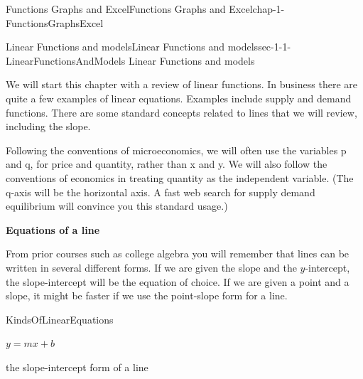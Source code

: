 \documentclass[oneside,10pt,]{book}
\newcommand{\terminology}[1]{\textbf{#1}}
\numberwithin{equation}{section}
\begin{document}
\typeout{************************************************}
%
\begin{chapterptx}{Functions Graphs and Excel}{}{Functions Graphs and Excel}{}{}{chap-1-FunctionsGraphsExcel}
%
%
\typeout{************************************************}
\typeout{************************************************}
%
\begin{sectionptx}{Linear Functions and models}{}{Linear Functions and models}{}{}{sec-1-1-LinearFunctionsAndModels}
\hypertarget{p-28}{}%
Linear Functions and models%
\par
\hypertarget{p-29}{}%
We will start this chapter with a review of linear functions. In business there are quite a few examples of linear equations. Examples include supply and demand functions. There are some standard concepts related to lines that we will review, including the slope.%
\par
\hypertarget{p-30}{}%
Following the conventions of microeconomics, we will often use the variables p and q, for price and quantity, rather than x and y.  We will also follow the conventions of economics in treating quantity as the independent variable.  (The q-axis will be the horizontal axis.  A fast web search for supply demand equilibrium will convince you this standard usage.)%
\par
\hypertarget{p-31}{}%
\terminology{Equations of a line}%
\par
\hypertarget{p-32}{}%
From prior courses such as college algebra you will remember that lines can be written in several different forms. If we are given the slope and the \(y\)-intercept, the slope-intercept will be the equation of choice. If we are given a point and a slope, it might be faster if we use the point-slope form for a line.%
\begin{assemblage}{}{KindsOfLinearEquations}%
\leavevmode%
\begin{sidebyside}{2}{0}{0}{0}%
\begin{sbspanel}{0.4}%
\hypertarget{p-33}{}%
\(y=m x+b\)%
\end{sbspanel}%
\begin{sbspanel}{0.6}%
\par
\hypertarget{p-34}{}%
the slope-intercept form of a line%
\end{sbspanel}%
\end{sidebyside}%
\begin{sidebyside}{2}{0}{0}{0}%
\begin{sbspanel}{0.4}%
\hypertarget{p-35}{}%

\end{sbspanel}
\end{sidebyside}
\end{assemblage}
\end{sectionptx}
\end{chapterptx}
\end{document}
